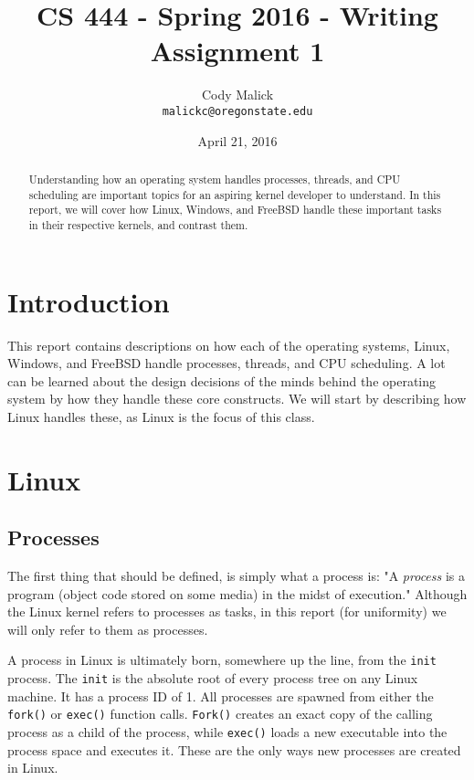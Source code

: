 \documentclass[10pt,letterpaper,onecolumn,draftclsnofoot]{IEEEtran}
\begin{document}
\begin{titlepage}
  \title{CS 444 - Spring 2016 - Writing Assignment 1}
  \author{Cody Malick\\
  \texttt{malickc@oregonstate.edu}}
  \date{April 21, 2016}
  \maketitle
  \vspace*{4cm}
  \begin{abstract}
      \noindent Understanding how an operating system handles processes, threads,
      and CPU scheduling are important topics for an aspiring kernel developer to
      understand. In this report, we will cover how Linux, Windows, and FreeBSD
      handle these important tasks in their respective kernels, and contrast them.
  \end{abstract}
\end{titlepage}

\tableofcontents
\clearpage
\section{Introduction}
This report contains descriptions on how each of the operating systems, Linux,
Windows, and FreeBSD handle processes, threads, and CPU scheduling. A lot can be
learned about the design decisions of the minds behind the operating system by
how they handle these core constructs. We will start by describing how Linux
handles these, as Linux is the focus of this class.

\section{Linux}
  \subsection{Processes}
The first thing that should be defined, is simply what a process is: "A
\textit{process} is a program (object code stored on some media) in the midst of
execution."\cite{robertlove2010} Although the Linux kernel refers to processes
as tasks, in this report (for uniformity) we will only refer to them as processes.

A process in Linux is ultimately born, somewhere up the line, from the
\texttt{init} process. The \texttt{init} is the absolute root of every process
tree on any Linux machine. It has a process ID of 1. All processes are spawned
from either the \texttt{fork()} or \texttt{exec()} function calls. \texttt{Fork()}
creates an exact copy of the calling process as a child of the process, while
\texttt{exec()} loads a new executable into the process space and executes it.
These are the only ways new processes are created in Linux.
\end{document}
